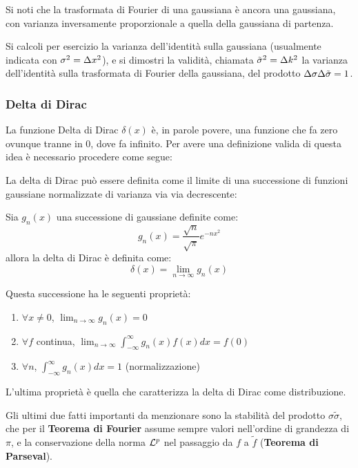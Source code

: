 Si noti che la trasformata di Fourier di una gaussiana è ancora una gaussiana, con varianza inversamente proporzionale a quella della gaussiana di partenza.

Si calcoli per esercizio la varianza dell'identità sulla gaussiana (usualmente indicata con $\sigma^2 = \Delta x^2$), e si dimostri la validità, chiamata $\tilde \sigma^2 = \Delta k^2$ la varianza dell'identità sulla trasformata di Fourier della gaussiana, del prodotto $\Delta \sigma \Delta \tilde \sigma = 1$.

\subsubsection*{Delta di Dirac}	
La funzione Delta di Dirac $\delta(x)$ è, in parole povere, una funzione che fa zero ovunque tranne in 0, dove fa infinito. Per avere una definizione valida di questa idea è necessario procedere come segue:
\begin{definizione}
	
La delta di Dirac può essere definita come il limite di una successione di funzioni gaussiane normalizzate di varianza via via decrescente:

Sia $g_n(x)$ una successione di gaussiane definite come:
\[
	g_n(x) = \frac{\sqrt{n}}{\sqrt{\pi}} e^{-n x^2}
\]
allora la delta di Dirac è definita come:
\[
	\delta(x) = \lim_{n \to \infty} g_n(x)
\]

Questa successione ha le seguenti proprietà:
\begin{enumerate}
	\item $\forall x \neq 0$, $\lim_{n \to \infty} g_n(x) = 0$
	\item $\forall f$ continua, $\lim_{n \to \infty} \int_{-\infty}^{\infty} g_n(x)f(x) dx = f(0)$
	\item $\forall n$, $\int_{-\infty}^{\infty} g_n(x) dx = 1$ (normalizzazione)
\end{enumerate}

L'ultima proprietà è quella che caratterizza la delta di Dirac come distribuzione.
\end{definizione}

Gli ultimi due fatti importanti da menzionare sono la stabilità del prodotto $\sigma\tilde\sigma$, che per il \textbf{Teorema di Fourier} assume sempre valori nell'ordine di grandezza di $\pi$, e la conservazione della norma $\mathcal{L}^p$ nel passaggio da $f$ a $\tilde f$ (\textbf{Teorema di Parseval}).